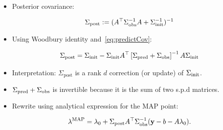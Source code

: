 \begin{frame}

\begin{itemize}
\item Posterior covariance:

\begin{equation}\label{eq:map_cov}
  \Sigma_\text{post} := ( A^\top {\Sigma}_\text{obs}^{-1} A + \Sigma_\text{init}^{-1} )^{-1}
\end{equation}

\bigskip
\item Using Woodbury identity and~\eqref{eq:predictCov}:

\begin{equation}\label{eq:map_cov_analytical}
  \Sigma_\text{post} = \Sigma_\text{init} - \Sigma_\text{init} A^\top \left[\Sigma_\text{pred} + \Sigma_\text{obs}\right]^{-1} A \Sigma_\text{init}
\end{equation}

\bigskip
\item Interpretation: $\Sigma_\text{post}$ is a rank $d$ correction (or update) of $\Sigma_\text{init}$.

\bigskip
\item $\Sigma_\text{pred} + \Sigma_\text{obs}$ is invertible because it is the sum of two s.p.d matrices. \\

\bigskip
\item Rewrite using analytical expression for the MAP point:

\begin{equation}\label{eq:map-point-analytical}
  \lambda^{\text{MAP}} = \lambda_0 + \Sigma_\text{post} A^\top \Sigma_\text{obs}^{-1} (\mathbf{y} - b - A\lambda_0).
\end{equation}

\end{itemize}

\end{frame}



